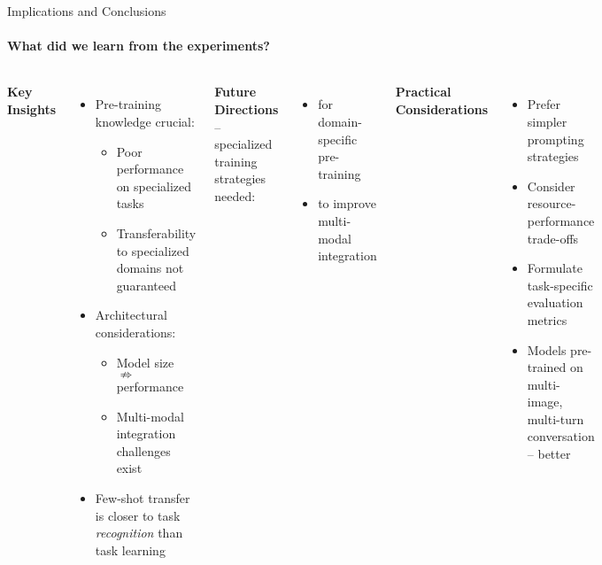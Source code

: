 \begin{frame}{Implications and Conclusions}
\framesubtitle{What did we learn from the experiments?}
  \vspace{-1em}
  \begin{columns}[T]
    \column{\customcolumnwidth}
      \textbf{Key Insights}
      \begin{itemize}
        \item Pre-training knowledge crucial:
          \begin{itemize}
            \item Poor performance on specialized tasks
            \item Transferability to specialized domains not guaranteed
          \end{itemize}
        \item Architectural considerations:
          \begin{itemize}
            \item Model size \(\nRightarrow\) performance
            \item Multi-modal integration challenges exist
          \end{itemize}
        \item Few-shot transfer is closer to task \emph{recognition} than task learning
      \end{itemize}
    \column{\customcolumnwidth}
      \textbf{Future Directions} -- specialized training strategies needed:
      \begin{itemize}
        \item for domain-specific pre-training
        \item to improve multi-modal integration
      \end{itemize}
      \textbf{Practical Considerations}
      \begin{itemize}
        \item Prefer simpler prompting strategies
        \item Consider resource-performance trade-offs
        \item Formulate task-specific evaluation metrics
        \item Models pre-trained on multi-image, multi-turn conversation -- better
      \end{itemize}
  \end{columns}
\end{frame}
